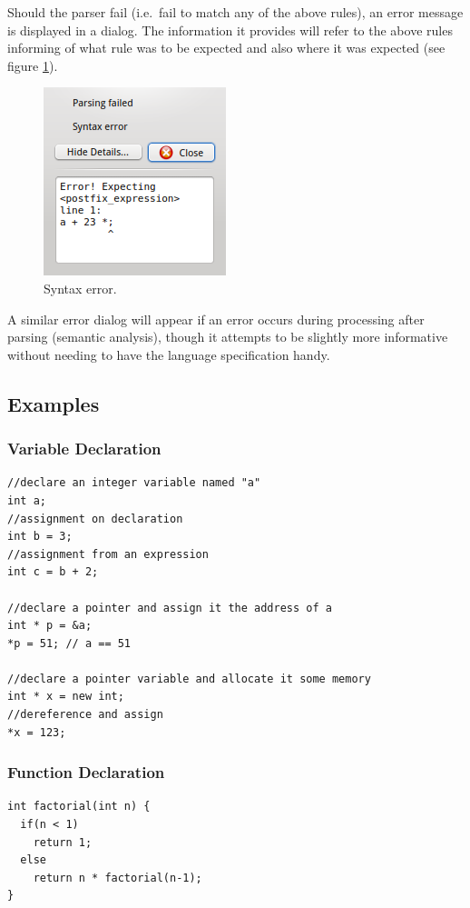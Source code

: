 \documentclass[a4paper,11pt]{article}
\begin{document}
Should the parser fail (i.e.\ fail to match any of the above rules), an error message is displayed in a dialog.
The information it provides will refer to the above rules informing of what rule was to be expected and also where it was expected (see figure \ref{fig:parseerror1}).
\begin{figure}[h!]
\centering
\includegraphics{parseerror1}
\caption{Syntax error.}
\label{fig:parseerror1}
\end{figure}
A similar error dialog will appear if an error occurs during processing after parsing (semantic analysis), though it attempts to be slightly more informative without needing to have the language specification handy.

\subsection{Examples}

\subsubsection{Variable Declaration}

\begin{lstlisting}
//declare an integer variable named "a"
int a;
//assignment on declaration
int b = 3;
//assignment from an expression
int c = b + 2;

//declare a pointer and assign it the address of a
int * p = &a;
*p = 51; // a == 51

//declare a pointer variable and allocate it some memory
int * x = new int;
//dereference and assign
*x = 123;
\end{lstlisting}

\subsubsection{Function Declaration}

\begin{lstlisting}
int factorial(int n) {
  if(n < 1)
    return 1;
  else
    return n * factorial(n-1);
}
\end{lstlisting}
\end{document}
